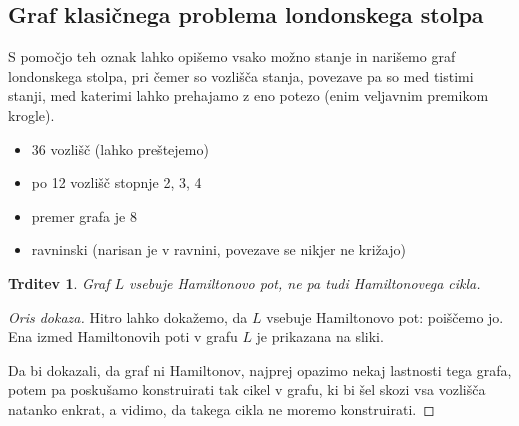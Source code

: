 \documentclass[11pt,a4paper]{article}
\theoremstyle{definition} %
\theoremstyle{plain} %
\newtheorem{lema}[definicija]{Lema}
\newtheorem{trditev}[definicija]{Trditev}
\begin{document}
\subsection{Graf klasičnega problema londonskega stolpa}
S pomočjo teh oznak lahko opišemo vsako možno stanje in narišemo graf londonskega stolpa, pri čemer so vozlišča stanja, povezave pa so med tistimi stanji, med katerimi lahko prehajamo z eno potezo (enim veljavnim premikom krogle).



\begin{itemize}
    \item 36 vozlišč (lahko preštejemo)
    \item po 12 vozlišč stopnje 2, 3, 4
    \item premer grafa je 8
    \item ravninski (narisan je v ravnini, povezave se nikjer ne križajo)
\end{itemize}

\medskip

\begin{trditev}
    Graf $L$ vsebuje Hamiltonovo pot, ne pa tudi Hamiltonovega cikla.
\end{trditev}

\begin{proof}[Oris dokaza]
    Hitro lahko dokažemo, da $L$ vsebuje Hamiltonovo pot: poiščemo jo. Ena izmed Hamiltonovih poti v grafu $L$ je prikazana na sliki.
    
    Da bi dokazali, da graf ni Hamiltonov, najprej opazimo nekaj lastnosti tega grafa, potem pa poskušamo konstruirati tak cikel v grafu, ki bi šel skozi vsa vozlišča natanko enkrat, a vidimo, da takega cikla ne moremo konstruirati.
    
%    
\end{proof}
\end{document}
